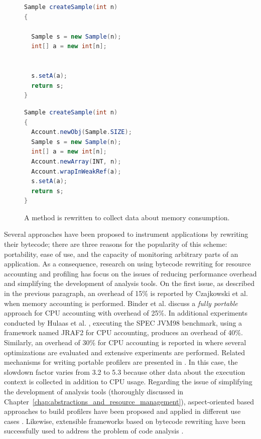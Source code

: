 \begin{figure}[ht]
\begin{mdframed}
\begin{minipage}[t]{0.45\textwidth}
\begin{lstlisting}[language=java,basicstyle=\footnotesize]
Sample createSample(int n)
{

  Sample s = new Sample(n);
  int[] a = new int[n];
  

  s.setA(a);
  return s;
}
\end{lstlisting}
\end{minipage}
\hspace{0.6cm}
\begin{minipage}[t]{0.45\textwidth}
\begin{lstlisting}[language=java,basicstyle=\footnotesize]
Sample createSample(int n)
{
  Account.newObj(Sample.SIZE);
  Sample s = new Sample(n);
  int[] a = new int[n];
  Account.newArray(INT, n);
  Account.wrapInWeakRef(a);
  s.setA(a);
  return s;
}
\end{lstlisting}
\end{minipage}
\end{mdframed}
\caption{A method is rewritten to collect data about memory consumption.}\label{lst:bytecode-rewriting}
\end{figure}

Several approaches have been proposed to instrument applications by rewriting their bytecode; there are three reasons for the popularity of this scheme: portability, ease of use, and the capacity of monitoring arbitrary parts of an application.
As a consequence, research on using bytecode rewriting for resource accounting and profiling has focus on the issues of reducing performance overhead and simplifying the development of analysis tools.
On the first issue, as described in the previous paragraph, an overhead of 15\% is reported by Czajkowski et al. \cite{czajkowski_jres:_1998} when memory accounting is performed.
Binder et al. \cite{binder_portable_2001} discuss a \textit{fully portable} approach for CPU accounting with overhead of 25\%.
In additional experiments conducted by Hulaas et al. \cite{Hulaas:2004:PTP:1014007.1014024,Hulaas:2008:PTL}, executing the SPEC JVM98 benchmark, using a framework named JRAF2 for CPU accounting, produces an overhead of 40\%.
Similarly, an overhead of 30\% for CPU accounting is reported in \cite{Binder200657,Hulaas:2008:PTL} where several optimizations are evaluated and extensive experiments are performed.
Related mechanisms for writing portable profilers are presented in \cite{Binder:2009:PPV:1464245.1464249,Binder200645}.
In this case, the slowdown factor varies from 3.2 to 5.3 because other data about the execution context is collected in addition to CPU usage.  
Regarding the issue of simplifying the development of analysis tools (thoroughly discussed in Chapter~\ref{chap:abstractions_and_resource_management}), aspect-oriented based approaches to build profilers have been proposed and applied in different use cases \cite{Pearce:2007:PA:1248445.1248448,Ansaloni:2010:RDE:1712605.1712616}.
Likewise, extensible frameworks based on bytecode rewriting have been successfully used to address the problem of code analysis \cite{Binder:2006:FEM:1173706.1173733,Maebe06javana:a, Marek:2012:DEL:2162037.2162046}.

